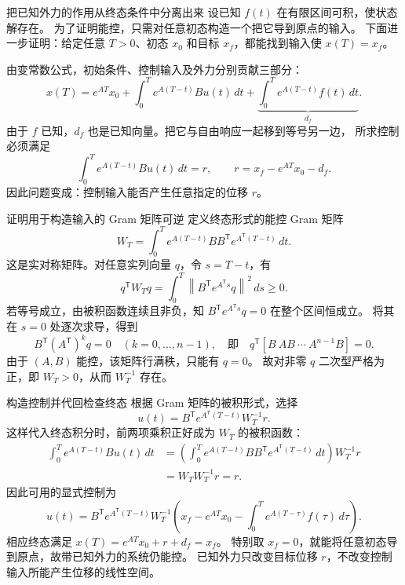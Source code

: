 \documentclass[11pt]{article}
\begin{document}
\begin{solution}
\begin{proofstep}{把已知外力的作用从终态条件中分离出来}
设已知 $f(t)$ 在有限区间可积，使状态解存在。
为了证明能控，只需对任意初态构造一个把它导到原点的输入。
下面进一步证明：给定任意 $T>0$、初态 $x_0$ 和目标 $x_f$，都能找到输入使 $x(T)=x_f$。

由变常数公式，初始条件、控制输入及外力分别贡献三部分：
\[
x(T)=e^{AT}x_0+\int_0^T e^{A(T-t)}Bu(t)\,dt
+\underbrace{\int_0^T e^{A(T-t)}f(t)\,dt}_{d_f}.
\]
由于 $f$ 已知，$d_f$ 也是已知向量。把它与自由响应一起移到等号另一边，
所求控制必须满足
\[
\int_0^T e^{A(T-t)}Bu(t)\,dt=r,
\qquad r=x_f-e^{AT}x_0-d_f.
\]
因此问题变成：控制输入能否产生任意指定的位移 $r$。
\end{proofstep}

\begin{proofstep}{证明用于构造输入的 Gram 矩阵可逆}
定义终态形式的能控 Gram 矩阵
\[
W_T=\int_0^T e^{A(T-t)}BB^{\mathsf T}e^{A^{\mathsf T}(T-t)}\,dt.
\]
这是实对称矩阵。对任意实列向量 $q$，令 $s=T-t$，有
\[
q^{\mathsf T}W_Tq=\int_0^T
\left\|B^{\mathsf T}e^{A^{\mathsf T}s}q\right\|^2\,ds\ge0.
\]
若等号成立，由被积函数连续且非负，知
$B^{\mathsf T}e^{A^{\mathsf T}s}q=0$ 在整个区间恒成立。
将其在 $s=0$ 处逐次求导，得到
\[
B^{\mathsf T}(A^{\mathsf T})^kq=0\quad(k=0,\ldots,n-1),
\quad\text{即}\quad q^{\mathsf T}[B\ AB\ \cdots\ A^{n-1}B]=0.
\]
由于 $(A,B)$ 能控，该矩阵行满秩，只能有 $q=0$。
故对非零 $q$ 二次型严格为正，即 $W_T>0$，从而 $W_T^{-1}$ 存在。
\end{proofstep}

\begin{proofstep}{构造控制并代回检查终态}
根据 Gram 矩阵的被积形式，选择
\[
u(t)=B^{\mathsf T}e^{A^{\mathsf T}(T-t)}W_T^{-1}r.
\]
这样代入终态积分时，前两项乘积正好成为 $W_T$ 的被积函数：
\begin{align*}
\int_0^T e^{A(T-t)}Bu(t)\,dt
&=\left(\int_0^T e^{A(T-t)}BB^{\mathsf T}
e^{A^{\mathsf T}(T-t)}\,dt\right)W_T^{-1}r\\
&=W_TW_T^{-1}r=r.
\end{align*}
因此可用的显式控制为
\[
\boxed{u(t)=B^{\mathsf T}e^{A^{\mathsf T}(T-t)}W_T^{-1}
\left(x_f-e^{AT}x_0-\int_0^T e^{A(T-\tau)}f(\tau)\,d\tau\right).}
\]
相应终态满足 $x(T)=e^{AT}x_0+r+d_f=x_f$。
特别取 $x_f=0$，就能将任意初态导到原点，故带已知外力的系统仍能控。
已知外力只改变目标位移 $r$，不改变控制输入所能产生位移的线性空间。
\end{proofstep}
\end{solution}
\end{document}

